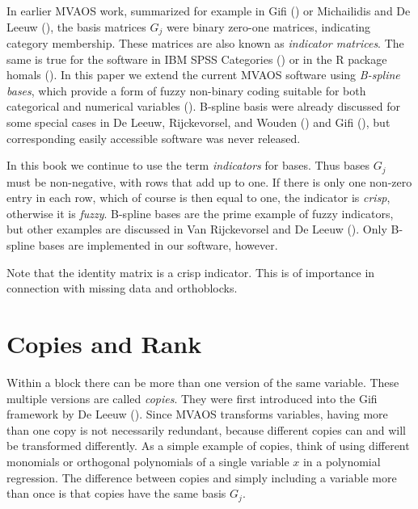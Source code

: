 \documentclass[
  12pt,
  letterpaper,
]{scrbook}
\begin{document}
In earlier MVAOS work, summarized for example in Gifi
() or Michailidis and De Leeuw
(), the basis matrices
\(G_j\) were binary zero-one matrices, indicating category membership.
These matrices are also known as \emph{indicator matrices}. The same is
true for the software in IBM SPSS Categories
() or in the R
package homals (). In this paper we extend the current MVAOS software using
\emph{B-spline bases}, which provide a form of fuzzy non-binary coding
suitable for both categorical and numerical variables
(). B-spline basis were already discussed for some special
cases in De Leeuw, Rijckevorsel, and Wouden
() and
Gifi (), but corresponding easily
accessible software was never released.

In this book we continue to use the term \emph{indicators} for bases.
Thus bases \(G_j\) must be non-negative, with rows that add up to one.
If there is only one non-zero entry in each row, which of course is then
equal to one, the indicator is \emph{crisp}, otherwise it is
\emph{fuzzy}. B-spline bases are the prime example of fuzzy indicators,
but other examples are discussed in Van Rijckevorsel and De Leeuw
(). Only B-spline bases
are implemented in our software, however.

Note that the identity matrix is a crisp indicator. This is of
importance in connection with missing data and orthoblocks.

\section{Copies and Rank}\label{copies-and-rank}

Within a block there can be more than one version of the same variable.
These multiple versions are called \emph{copies}. They were first
introduced into the Gifi framework by De Leeuw
(). Since MVAOS transforms variables,
having more than one copy is not necessarily redundant, because
different copies can and will be transformed differently. As a simple
example of copies, think of using different monomials or orthogonal
polynomials of a single variable \(x\) in a polynomial regression. The
difference between copies and simply including a variable more than once
is that copies have the same basis \(G_j\).
\end{document}
